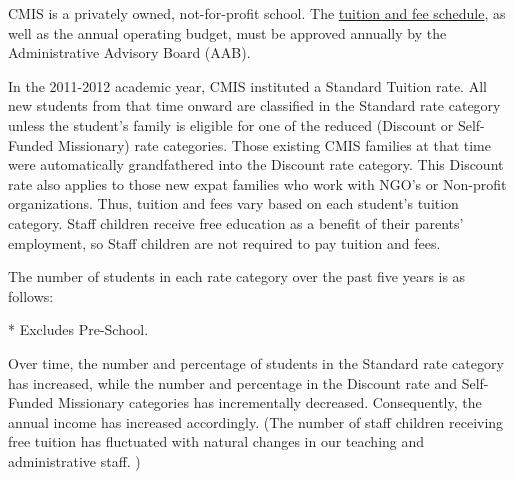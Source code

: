 CMIS is a privately owned, not-for-profit school.  The \href{https://docs.google.com/document/d/1j2Z1tLgRgfX9CH3dzoYtU_GOhPOVWKPl6iFlvWqd6wM/edit?usp=sharing}{tuition and fee schedule}, as well as the annual operating budget, must be approved annually by the Administrative Advisory Board (AAB). 


In the 2011-2012 academic year, CMIS instituted a Standard Tuition rate.  All new students from that time onward are classified in the Standard rate category unless the student’s family is eligible for one of the reduced (Discount or Self-Funded Missionary) rate categories.  Those existing CMIS families at that time were automatically grandfathered into the Discount rate category.  This Discount rate also applies to those new expat families who work with NGO’s or Non-profit organizations.  Thus, tuition and fees vary based on each student’s tuition category.  Staff children receive free education as a benefit of their parents’ employment, so Staff children are not required to pay tuition and fees.  

The number of students in each rate category over the past five years is as follows:

* Excludes Pre-School.  


Over time, the number and percentage of students in the Standard rate category has increased, while the number and percentage in the Discount rate and Self-Funded Missionary categories has incrementally decreased.  Consequently, the annual income has increased accordingly.  (The number of staff children receiving free tuition has fluctuated with natural changes in our teaching and administrative staff. )  
 
